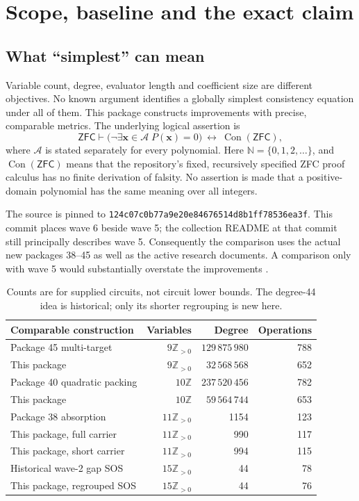 \documentclass[11pt]{article}
\theoremstyle{remark}\newtheorem{remark}[theorem]{Remark}
\newcommand{\N}{\mathbb N}
\newcommand{\Z}{\mathbb Z}
\newcommand{\Pos}{\mathbb Z_{>0}}
\newcommand{\Con}{\operatorname{Con}}
\newcommand{\ZFC}{\mathsf{ZFC}}
\newcommand{\pin}{\texttt{124c07c0b77a9e20e84676514d8b1ff78536ea3f}}
\begin{document}
\section{Scope, baseline and the exact claim}

\subsection{What ``simplest'' can mean}
Variable count, degree, evaluator length and coefficient size are different
objectives. No known argument identifies a globally simplest consistency
equation under all of them. This package constructs improvements with
precise, comparable metrics. The underlying logical assertion is
\begin{equation}\label{eq:logicaltarget}
 \ZFC\vdash
 \bigl(\neg\exists\mathbf x\in\mathcal A\;P(\mathbf x)=0\bigr)
 \ \longleftrightarrow\ \Con(\ZFC),
\end{equation}
where $\mathcal A$ is stated separately for every polynomial. Here
$\N=\{0,1,2,\ldots\}$, and $\Con(\ZFC)$ means that the repository's
fixed, recursively specified ZFC proof calculus has no finite derivation
of falsity. No assertion is made that a positive-domain polynomial has
the same meaning over all integers.

The source is pinned to \pin. This commit places wave 6 beside wave 5;
the collection README at that commit still principally describes wave 5.
Consequently the comparison uses the actual new packages 38--45 as well
as the active research documents. A comparison only with wave 5 would
substantially overstate the improvements \cite{repo,package38,package40,package44,package45}.

\begin{table}[ht]
\centering\small
\begin{tabular}{@{}lrrr@{}}
\toprule
Comparable construction & Variables & Degree & Operations\\
\midrule
Package 45 multi-target & $9\Pos$ & $129\,875\,980$ & 788\\
This package & $9\Pos$ & $32\,568\,568$ & 652\\
Package 40 quadratic packing & $10\Z$ & $237\,520\,456$ & 782\\
This package & $10\Z$ & $59\,564\,744$ & 653\\
Package 38 absorption & $11\Pos$ & 1154 & 123\\
This package, full carrier & $11\Pos$ & 990 & 117\\
This package, short carrier & $11\Pos$ & 994 & 115\\
Historical wave-2 gap SOS & $15\Pos$ & 44 & 78\\
This package, regrouped SOS & $15\Pos$ & 44 & 76\\
\bottomrule
\end{tabular}
\caption{Counts are for supplied circuits, not circuit lower bounds.
The degree-44 idea is historical; only its shorter regrouping is new here.}
\end{table}
\end{document}

